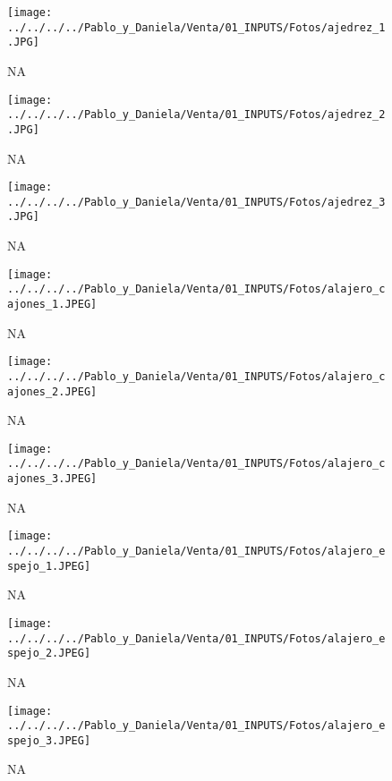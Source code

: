 \documentclass[
]{article}
\begin{document}
\pagebreak

\begin{figure}
\centering
\texttt{[image: ../../../../Pablo\_y\_Daniela/Venta/01\_INPUTS/Fotos/ajedrez\_1.JPG]}
\caption{NA}
\end{figure}

\pagebreak

\begin{figure}
\centering
\texttt{[image: ../../../../Pablo\_y\_Daniela/Venta/01\_INPUTS/Fotos/ajedrez\_2.JPG]}
\caption{NA}
\end{figure}

\pagebreak

\begin{figure}
\centering
\texttt{[image: ../../../../Pablo\_y\_Daniela/Venta/01\_INPUTS/Fotos/ajedrez\_3.JPG]}
\caption{NA}
\end{figure}

\pagebreak

\begin{figure}
\centering
\texttt{[image: ../../../../Pablo\_y\_Daniela/Venta/01\_INPUTS/Fotos/alajero\_cajones\_1.JPEG]}
\caption{NA}
\end{figure}

\pagebreak

\begin{figure}
\centering
\texttt{[image: ../../../../Pablo\_y\_Daniela/Venta/01\_INPUTS/Fotos/alajero\_cajones\_2.JPEG]}
\caption{NA}
\end{figure}

\pagebreak

\begin{figure}
\centering
\texttt{[image: ../../../../Pablo\_y\_Daniela/Venta/01\_INPUTS/Fotos/alajero\_cajones\_3.JPEG]}
\caption{NA}
\end{figure}

\pagebreak

\begin{figure}
\centering
\texttt{[image: ../../../../Pablo\_y\_Daniela/Venta/01\_INPUTS/Fotos/alajero\_espejo\_1.JPEG]}
\caption{NA}
\end{figure}

\pagebreak

\begin{figure}
\centering
\texttt{[image: ../../../../Pablo\_y\_Daniela/Venta/01\_INPUTS/Fotos/alajero\_espejo\_2.JPEG]}
\caption{NA}
\end{figure}

\pagebreak

\begin{figure}
\centering
\texttt{[image: ../../../../Pablo\_y\_Daniela/Venta/01\_INPUTS/Fotos/alajero\_espejo\_3.JPEG]}
\caption{NA}
\end{figure}
\end{document}
